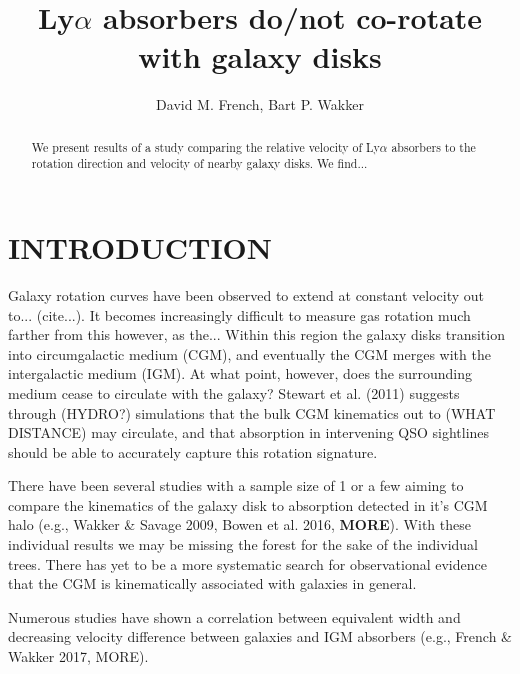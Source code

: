 \documentclass[iop]{emulateapj-rtx4}
\begin{document}
\title{Ly$\alpha$ absorbers do/not co-rotate with galaxy disks}

\author{David M. French, Bart P. Wakker}


\begin{abstract}

We present results of a study comparing the relative velocity of Ly$\alpha$ absorbers to the rotation direction and velocity of nearby galaxy disks. We find...

\end{abstract}




\section{INTRODUCTION}
Galaxy rotation curves have been observed to extend at constant velocity out to... (cite...). It becomes increasingly difficult to measure gas rotation much farther from this however, as the... Within this region the galaxy disks transition into circumgalactic medium (CGM), and eventually the CGM merges with the intergalactic medium (IGM). At what point, however, does the surrounding medium cease to circulate with the galaxy? Stewart et al. (2011) suggests through (HYDRO?) simulations that the bulk CGM kinematics out to (WHAT DISTANCE) may circulate, and that absorption in intervening QSO sightlines should be able to accurately capture this rotation signature.

There have been several studies with a sample size of 1 or a few aiming to compare the kinematics of the galaxy disk to absorption detected in it's CGM halo (e.g., Wakker \& Savage 2009, Bowen et al. 2016, \textbf{MORE}). With these individual results we may be missing the forest for the sake of the individual trees. There has yet to be a more systematic search for observational evidence that the CGM is kinematically associated with galaxies in general.

Numerous studies have shown a correlation between equivalent width and decreasing velocity difference between galaxies and IGM absorbers (e.g., French \& Wakker 2017, MORE).
\end{document}

